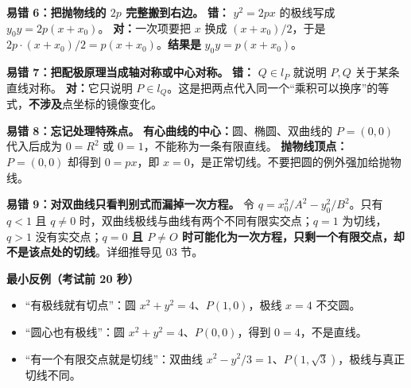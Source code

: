 \begin{trapbox}
\medskip
\textbf{\textcolor{CTrap}{易错 6：把抛物线的 $2p$ 完整搬到右边。}}
\textbf{错：} $y^2=2px$ 的极线写成 $y_0y=2p(x+x_0)$。
\textbf{对：}一次项要把 $x$ 换成 $(x+x_0)/2$，于是 $2p\cdot (x+x_0)/2=p(x+x_0)$。\textbf{结果是} $\boxed{y_0y=p(x+x_0)}$。

\medskip
\textbf{\textcolor{CTrap}{易错 7：把配极原理当成轴对称或中心对称。}}
\textbf{错：} $Q\in l_P$ 就说明 $P,Q$ 关于某条直线对称。
\textbf{对：}它只说明 $P\in l_Q$。这是把两点代入同一个“乘积可以换序”的等式，\textbf{不涉及}点坐标的镜像变化。

\medskip
\textbf{\textcolor{CTrap}{易错 8：忘记处理特殊点。}}
\textbf{有心曲线的中心：}圆、椭圆、双曲线的 $P=(0,0)$ 代入后成为 $0=R^2$ 或 $0=1$，不能称为一条有限直线。
\textbf{抛物线顶点：} $P=(0,0)$ 却得到 $0=p x$，即 $x=0$，是正常切线。不要把圆的例外强加给抛物线。

\medskip
\textbf{\textcolor{CTrap}{易错 9：对双曲线只看判别式而漏掉一次方程。}}
令 $q=x_0^2/A^2-y_0^2/B^2$。只有 $q<1$ 且 $q\ne0$ 时，双曲线极线与曲线有两个不同有限实交点；$q=1$ 为切线，$q>1$ 没有实交点；\textbf{$q=0$ 且 $P\ne O$ 时可能化为一次方程，只剩一个有限交点，却不是该点处的切线}。详细推导见 03 节。

\medskip
\textbf{\textcolor{CTrap}{最小反例（考试前 20 秒）}}
\begin{itemize}[leftmargin=*,itemsep=0.25em]
\item “有极线就有切点”：圆 $x^2+y^2=4$、$P(1,0)$，极线 $x=4$ 不交圆。
\item “圆心也有极线”：圆 $x^2+y^2=4$、$P(0,0)$，得到 $0=4$，不是直线。
\item “有一个有限交点就是切线”：双曲线 $x^2-y^2/3=1$、$P(1,\sqrt3)$，极线与真正切线不同。
\end{itemize}
\end{trapbox}

